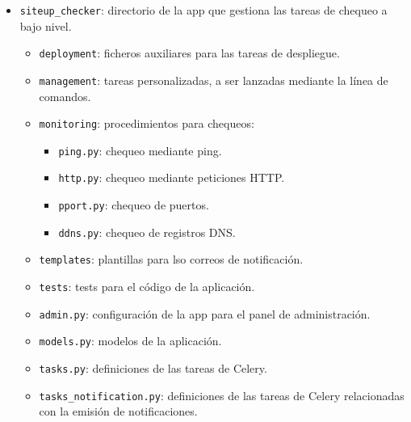 \begin{itemize}
\item \texttt{siteup\_checker}: directorio de la app que gestiona las tareas de chequeo a bajo nivel.
  \begin{itemize}
  \item \texttt{deployment}: ficheros auxiliares para las tareas de despliegue.
  \item \texttt{management}: tareas personalizadas, a ser lanzadas mediante la línea de comandos.
  \item \texttt{monitoring}: procedimientos para chequeos:
    \begin{itemize}
    \item \texttt{ping.py}: chequeo mediante ping.
    \item \texttt{http.py}: chequeo mediante peticiones HTTP.
    \item \texttt{pport.py}: chequeo de puertos.
    \item \texttt{ddns.py}: chequeo de registros DNS.
    \end{itemize}
  \item \texttt{templates}: plantillas para lso correos de notificación.
  \item \texttt{tests}: tests para el código de la aplicación.
  \item \texttt{admin.py}: configuración de la app para el panel de administración.
  \item \texttt{models.py}: modelos de la aplicación.
  \item \texttt{tasks.py}: definiciones de las tareas de Celery.
  \item \texttt{tasks\_notification.py}: definiciones de las tareas de Celery
    relacionadas con la emisión de notificaciones.
  \end{itemize}


\end{itemize}
